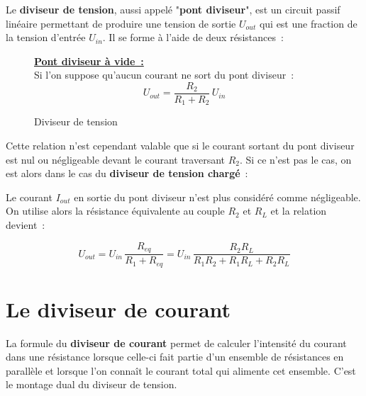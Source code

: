 Le \textbf{diviseur de tension}, aussi appelé "\textbf{pont diviseur}", est un circuit passif linéaire permettant de produire une tension de sortie $U_{out}$ qui est une fraction de la tension d'entrée $U_{in}$. Il se forme à l'aide de deux résistances~:

\begin{figure}[!h]
\begin{center}
\begin{minipage}{8cm}
	
\end{minipage}
\begin{minipage}{8cm}

	\textbf{\underline{Pont diviseur à vide~:}}\\

	Si l'on suppose qu'aucun courant ne sort du pont diviseur~:
	\begin{equation}
		U_{out} = \dfrac{R_2}{R_1 + R_2}\,U_{in}
	\end{equation}
\end{minipage}
\end{center}
\caption{Diviseur de tension}
\end{figure}

Cette relation n'est cependant valable que si le courant sortant du pont diviseur est nul ou négligeable devant le courant traversant $R_2$. Si ce n'est pas le cas, on est alors dans le cas du \textbf{diviseur de tension chargé}~:\\


\begin{center}
	
\end{center}

Le courant $I_{out}$ en sortie du pont diviseur n'est plus considéré comme négligeable. On utilise alors la résistance équivalente au couple $R_2$ et $R_L$ et la relation devient~:

$$ U_{out} = U_{in}\,\dfrac{R_{eq}}{R_1+R_{eq}} = U_{in} \, \dfrac{ R_2R_L }{R_1R_2 + R_1R_L + R_2R_L} $$


\section{Le diviseur de courant}

La formule du \textbf{diviseur de courant} permet de calculer l'intensité du courant dans une résistance lorsque celle-ci fait partie d'un ensemble de résistances en parallèle et lorsque l'on connaît le courant total qui alimente cet ensemble. C'est le montage dual du diviseur de tension.


